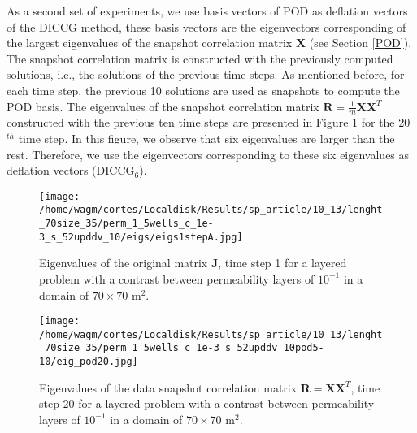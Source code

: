 \documentclass[12pt]{article}
\numberwithin{equation}{section}
\begin{document}
As a second set of experiments, we use basis vectors of POD as deflation vectors of the DICCG method, these basis vectors are the eigenvectors corresponding of the largest eigenvalues of the snapshot correlation matrix $\mathbf{X}$ (see Section \ref{POD}). The snapshot correlation matrix is constructed with the previously computed solutions, i.e., the solutions of the previous time steps. As mentioned before, for each time step, the previous 10 solutions are used as snapshots to compute the POD basis. The eigenvalues of the snapshot correlation matrix $\mathbf{R}=\frac{1}{m}\mathbf{X}\mathbf{X}^T$ constructed with the previous ten time steps are presented in Figure \ref{fig:eig_POD_1} for the 20$^{th}$ time step. In this figure, we observe that six eigenvalues are larger than the rest. Therefore, we use the eigenvectors corresponding to these six eigenvalues as deflation vectors (DICCG$_6$). 
\begin{figure}[!h]
\centering
\begin{minipage}{.4\textwidth}
 \centering
 \vspace{-3mm}
\texttt{[image: /home/wagm/cortes/Localdisk/Results/sp\_article/10\_13/lenght\_70size\_35/perm\_1\_5wells\_c\_1e-3\_s\_52upddv\_10/eigs/eigs1stepA.jpg]}
 \vspace{-10pt}
\caption{Eigenvalues of the original matrix $\mathbf{J}$, time step 1 for a layered problem with a contrast between permeability layers of $10^{-1}$ in a domain of $70 \times 70$ m$^2$.}\label{fig:eigs_A_1}
\end{minipage}%
\hspace{1cm}
\begin{minipage}{.4\textwidth}
 \centering
\texttt{[image: /home/wagm/cortes/Localdisk/Results/sp\_article/10\_13/lenght\_70size\_35/perm\_1\_5wells\_c\_1e-3\_s\_52upddv\_10pod5-10/eig\_pod20.jpg]}
\vspace{-5mm}
\caption{Eigenvalues of the data snapshot correlation matrix $\mathbf{R}=\mathbf{X}\mathbf{X}^T$, time step 20 for a layered problem with a contrast between permeability layers of $10^{-1}$ in a domain of $70 \times 70$ m$^2$.}
\label{fig:eig_POD_1}
\end{minipage}
\end{figure}
\end{document}
